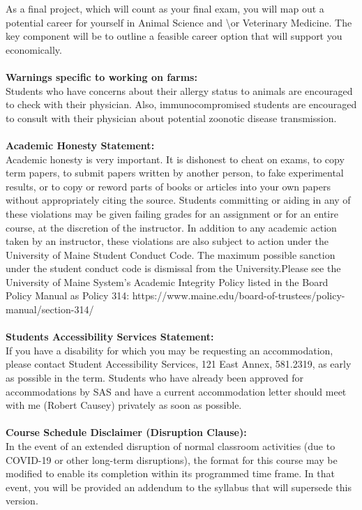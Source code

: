 \documentclass[11pt]{article}
\begin{document}
As a final project, which will count as your final exam, you will map out a potential career for yourself in Animal Science and \textbackslash or Veterinary Medicine. The key component will be to outline a feasible career option that will support you economically. \\~\\ 
\textbf{Warnings specific to working on farms:}\\ Students who have concerns about their allergy status to animals are encouraged to check with their physician. Also, immunocompromised students are encouraged to consult with their physician about potential zoonotic disease transmission.\\~\\ 
\noindent
\textbf{Academic Honesty Statement:} \\Academic honesty is very important. It is dishonest to cheat on exams, to copy term papers, to submit papers written by another person, to fake experimental results, or to copy or reword parts of books or articles into your own papers without appropriately citing the source. Students committing or aiding in any of these violations may be given failing grades for an assignment or for an entire course, at the discretion of the instructor. In addition to any academic action taken by an instructor, these violations are also subject to action under the University of Maine Student Conduct Code.  The maximum possible sanction under the student conduct code is dismissal from the University.Please see the University of Maine System’s Academic Integrity Policy  listed in the Board Policy Manual as Policy 314: https://www.maine.edu/board-of-trustees/policy-manual/section-314/ \\~\\ 
\textbf{Students Accessibility Services Statement:} \\If you have a disability for which you may be requesting an accommodation, please contact Student Accessibility Services, 121 East Annex, 581.2319, as early as possible in the term. Students who have already been approved for accommodations by SAS and have a current accommodation letter should meet with me (Robert Causey) privately as soon as possible.\\~\\ 
\textbf{Course Schedule Disclaimer (Disruption Clause):}\\ In the event of an extended disruption of normal classroom activities (due to COVID-19 or other long-term disruptions), the format for this course may be modified to enable its completion within its programmed time frame. In that event, you will be provided an addendum to the syllabus that will supersede this version.\\~\\ 
\end{document}
